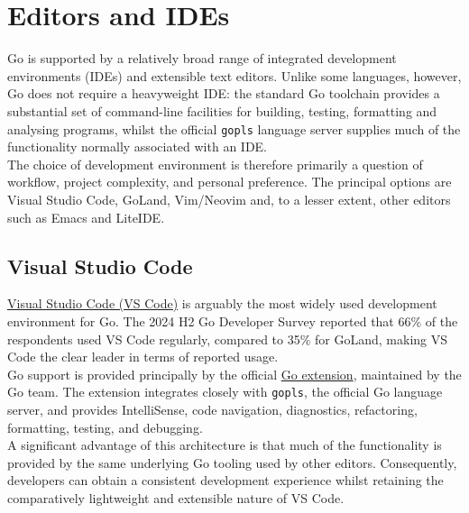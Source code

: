\section{Editors and IDEs}

Go is supported by a relatively broad range of integrated development environments (IDEs) and extensible text editors. Unlike some languages, however, Go does not require a heavyweight IDE: the standard Go toolchain provides a substantial set of command-line facilities for building, testing, formatting and analysing programs, whilst the official \texttt{gopls} language server supplies much of the functionality normally associated with an IDE.\\

The choice of development environment is therefore primarily a question of workflow, project complexity, and personal preference. The principal options are Visual Studio Code, GoLand, Vim/Neovim and, to a lesser extent, other editors such as Emacs and LiteIDE.\\

\subsection{Visual Studio Code}

\href{https://code.visualstudio.com/}{Visual Studio Code (VS Code)} is arguably the most widely used development environment for Go. The 2024 H2 Go Developer Survey reported that 66\% of the respondents used VS Code regularly, compared to 35\% for GoLand, making VS Code the clear leader in terms of reported usage.\\

Go support is provided principally by the official
\href{https://marketplace.visualstudio.com/items?itemName=golang.go}{Go extension}, maintained by the Go team. The extension integrates closely with \texttt{gopls}, the official Go language server, and provides IntelliSense, code navigation, diagnostics, refactoring, formatting, testing, and debugging.\\

A significant advantage of this architecture is that much of the functionality is provided by the same underlying Go tooling used by other editors. Consequently, developers can obtain a consistent development experience whilst retaining the comparatively lightweight and extensible nature of VS Code.\\

